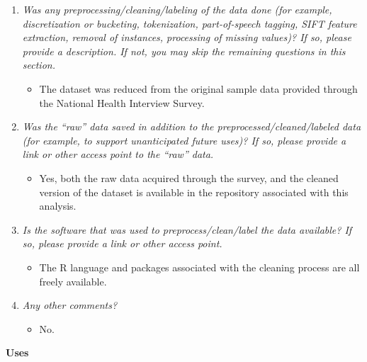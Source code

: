 \documentclass[
]{article}
\providecommand{\tightlist}{%
  \setlength{\itemsep}{0pt}\setlength{\parskip}{0pt}}
\begin{document}
\begin{enumerate}
\def\labelenumi{\arabic{enumi}.}
\tightlist
\item
  \emph{Was any preprocessing/cleaning/labeling of the data done (for
  example, discretization or bucketing, tokenization, part-of-speech
  tagging, SIFT feature extraction, removal of instances, processing of
  missing values)? If so, please provide a description. If not, you may
  skip the remaining questions in this section.}

  \begin{itemize}
  \tightlist
  \item
    The dataset was reduced from the original sample data provided
    through the National Health Interview Survey.
  \end{itemize}
\item
  \emph{Was the ``raw'' data saved in addition to the
  preprocessed/cleaned/labeled data (for example, to support
  unanticipated future uses)? If so, please provide a link or other
  access point to the ``raw'' data.}

  \begin{itemize}
  \tightlist
  \item
    Yes, both the raw data acquired through the survey, and the cleaned
    version of the dataset is available in the repository associated
    with this analysis.
  \end{itemize}
\item
  \emph{Is the software that was used to preprocess/clean/label the data
  available? If so, please provide a link or other access point.}

  \begin{itemize}
  \tightlist
  \item
    The R language and packages associated with the cleaning process are
    all freely available.
  \end{itemize}
\item
  \emph{Any other comments?}

  \begin{itemize}
  \tightlist
  \item
    No.
  \end{itemize}
\end{enumerate}

\textbf{Uses}
\end{document}

